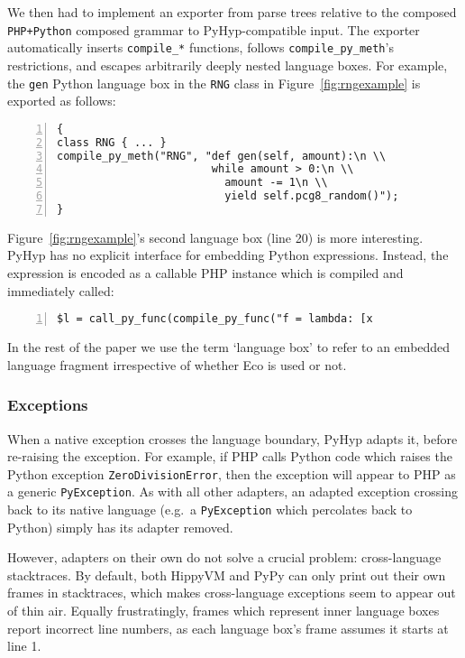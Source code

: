 \documentclass[a4paper,UKenglish]{lipics-v2016}
\newcommand{\ourvm}{PyHyp\xspace}
\newcommand{\hippy}{HippyVM\xspace}
\newcommand{\pypy}{PyPy\xspace}
\begin{document}
We then had to implement an exporter from parse trees relative to the composed \texttt{PHP+Python}
composed grammar to \ourvm-compatible input. The exporter automatically inserts
\texttt{compile\_*} functions, follows \texttt{compile\_py\_meth}'s
restrictions, and escapes arbitrarily deeply nested language boxes.  For
example, the \texttt{gen} Python language box in the \texttt{RNG} class in
Figure~\ref{fig:rngexample} is exported as follows:
\begin{lstlisting}[numbers=left]
{
class RNG { ... }
compile_py_meth("RNG", "def gen(self, amount):\n \\
                        while amount > 0:\n \\
                          amount -= 1\n \\
                          yield self.pcg8_random()");
}
\end{lstlisting}
Figure~\ref{fig:rngexample}'s second language
box (line 20) is more interesting. \ourvm has no explicit interface for
embedding Python expressions. Instead, the expression is encoded as a callable PHP
instance which is compiled and immediately called:
\begin{lstlisting}[numbers=left]
$l = call_py_func(compile_py_func("f = lambda: [x \end{lstlisting}
In the rest of the paper we use the term `language box' to refer to an embedded
language fragment irrespective of whether Eco is used or not.


\subsubsection{Exceptions}

When a native exception crosses the language boundary, \ourvm adapts it, before
re-raising the exception. For example, if PHP calls Python code which raises the
Python exception \texttt{ZeroDivisionError}, then the exception will appear to
PHP as a generic \texttt{PyException}. As with all other adapters, an adapted
exception crossing back to
its native language (e.g.~a \texttt{PyException} which percolates back to
Python) simply has its adapter removed.

However, adapters on their own do not solve a crucial problem: cross-language
stacktraces. By default, both \hippy and \pypy can only print out their own
frames in stacktraces, which makes cross-language exceptions seem to appear out
of thin air. Equally frustratingly, frames which represent inner language boxes
report incorrect line numbers, as each language box's frame assumes it
starts at line 1.
\end{document}
